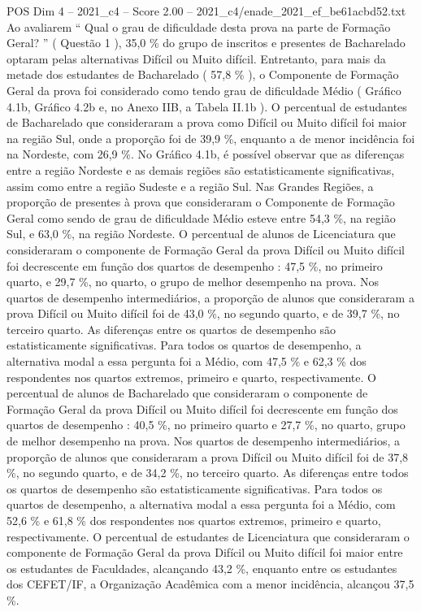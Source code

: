 \begin{textsample}{POS Dim 4 – 2021\_c4 – Score 2.00 – 2021\_c4/enade\_2021\_ef\_be61acbd52.txt}
Ao avaliarem “ Qual o grau de dificuldade desta prova na parte de Formação Geral? ” ( Questão 1 ), 35,0 \% do grupo de inscritos e presentes de Bacharelado optaram pelas alternativas Difícil ou Muito difícil.
Entretanto, para mais da metade dos estudantes de Bacharelado ( 57,8 \% ), o Componente de Formação Geral da prova foi considerado como tendo grau de dificuldade Médio ( Gráfico 4.1b, Gráfico 4.2b e, no Anexo IIB, a Tabela II.1b ).
O percentual de estudantes de Bacharelado que consideraram a prova como Difícil ou Muito difícil foi maior na região Sul, onde a proporção foi de 39,9 \%, enquanto a de menor incidência foi na Nordeste, com 26,9 \%.
No Gráfico 4.1b, é possível observar que as diferenças entre a região Nordeste e as demais regiões são estatisticamente significativas, assim como entre a região Sudeste e a região Sul.
Nas Grandes Regiões, a proporção de presentes à prova que consideraram o Componente de Formação Geral como sendo de grau de dificuldade Médio esteve entre 54,3 \%, na região Sul, e 63,0 \%, na região Nordeste.
O percentual de alunos de Licenciatura que consideraram o componente de Formação Geral da prova Difícil ou Muito difícil foi decrescente em função dos quartos de desempenho : 47,5 \%, no primeiro quarto, e 29,7 \%, no quarto, o grupo de melhor desempenho na prova.
Nos quartos de desempenho intermediários, a proporção de alunos que consideraram a prova Difícil ou Muito difícil foi de 43,0 \%, no segundo quarto, e de 39,7 \%, no terceiro quarto.
As diferenças entre os quartos de desempenho são estatisticamente significativas.
Para todos os quartos de desempenho, a alternativa modal a essa pergunta foi a Médio, com 47,5 \% e 62,3 \% dos respondentes nos quartos extremos, primeiro e quarto, respectivamente.
O percentual de alunos de Bacharelado que consideraram o componente de Formação Geral da prova Difícil ou Muito difícil foi decrescente em função dos quartos de desempenho : 40,5 \%, no primeiro quarto e 27,7 \%, no quarto, grupo de melhor desempenho na prova.
Nos quartos de desempenho intermediários, a proporção de alunos que consideraram a prova Difícil ou Muito difícil foi de 37,8 \%, no segundo quarto, e de 34,2 \%, no terceiro quarto.
As diferenças entre todos os quartos de desempenho são estatisticamente significativas.
Para todos os quartos de desempenho, a alternativa modal a essa pergunta foi a Médio, com 52,6 \% e 61,8 \% dos respondentes nos quartos extremos, primeiro e quarto, respectivamente.
O percentual de estudantes de Licenciatura que consideraram o componente de Formação Geral da prova Difícil ou Muito difícil foi maior entre os estudantes de Faculdades, alcançando 43,2 \%, enquanto entre os estudantes dos CEFET/IF, a Organização Acadêmica com a menor incidência, alcançou 37,5 \%.

\end{textsample}
